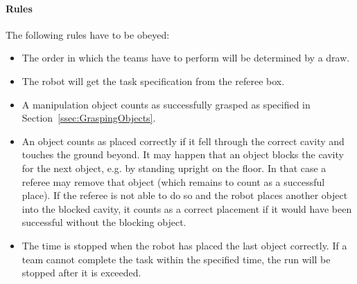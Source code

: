 \paragraph{Rules}
The following rules have to be obeyed:

\begin{itemize}

\item The order in which the teams have to perform will be determined by a draw.
\item The robot will get the task specification from the referee box.
\item A manipulation object counts as successfully grasped as specified in Section~\ref{ssec:GraspingObjects}.
\item An object counts as placed correctly if it fell through the correct cavity and touches the ground beyond. It may happen that an object blocks the cavity for the next object, e.g. by standing upright on the floor. In that case a referee may remove that object (which remains to count as a successful place). If the referee is not able to do so and the robot places another object into the blocked cavity, it counts as a correct placement if it would have been successful without the blocking object.
\item The time is stopped when the robot has placed the last object correctly. If a team cannot complete the task within the specified time, the run will be stopped after it is exceeded.  

\end{itemize}

%


